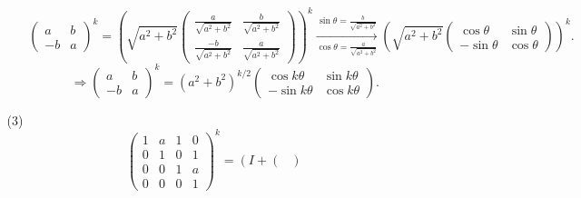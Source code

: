 \documentclass{article}
\begin{document}
\begin{enumerate}
\begin{enumerate}
\begin{enumerate}
\[                    {\begin{pmatrix}
                        a& b\\
                        -b& a
                    \end{pmatrix}}^{k}
                    =
                    {\left(
                        \sqrt{a^2+b^2}
                        \begin{pmatrix}
                            \frac{a}{\sqrt{a^2+b^2}} & \frac{b}{\sqrt{a^2+b^2}}\\
                            \frac{-b}{\sqrt{a^2+b^2}} & \frac{a}{\sqrt{a^2+b^2}}
                        \end{pmatrix}
                    \right)}^{k}
                    \xrightarrow[\cos\theta=\frac{a}{\sqrt{a^2+b^2}}]{\sin\theta=\frac{b}{\sqrt{a^2+b^2}}}
                    {\left(
                        \sqrt{a^2+b^2}
                        \begin{pmatrix}
                            \cos\theta & \sin\theta \\
                            -\sin\theta & \cos\theta
                        \end{pmatrix}
                    \right)}^{k}.
                \]
                \[
                    \Rightarrow
                    {\begin{pmatrix}
                        a& b\\
                        -b& a
                    \end{pmatrix}}^{k}
                    =
                    {(a^2+b^2)}^{k/2}
                    \begin{pmatrix}
                        \cos k\theta & \sin k\theta\\
                        -\sin k\theta & \cos k\theta
                    \end{pmatrix}.
                \]
            \end{enumerate}
            \item [(3)]
            \[
                {\begin{pmatrix}
                    1& a& 1& 0\\
                    0& 1& 0& 1\\
                    0& 0& 1& a\\
                    0& 0& 0& 1
                \end{pmatrix}}^{k}
                =
                {\left(
                    I+
                    \begin{pmatrix}

\end{pmatrix}}\]
\end{enumerate}
\end{enumerate}
\end{document}
